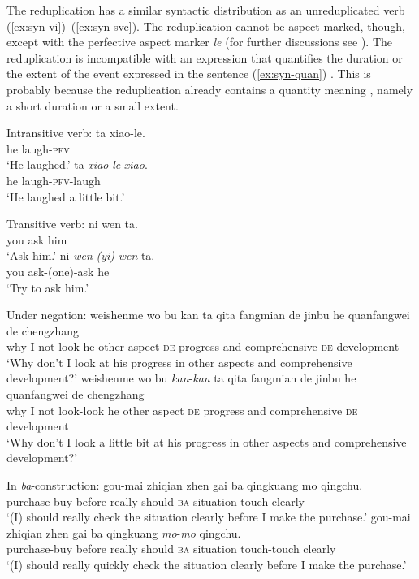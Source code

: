 The reduplication has a similar syntactic distribution as an unreduplicated verb (\ref{ex:syn-vi})--(\ref{ex:syn-svc}). 
The reduplication cannot be aspect marked, though, except with the perfective aspect marker \textit{le} (for further discussions see ). 
The reduplication is incompatible with an expression that quantifies the duration or the extent of the event expressed in the sentence (\ref{ex:syn-quan}) \citetext{ \citealp[83--84]{Li1998}; \citealp[114--115]{Chen2005}}.
This is probably because the reduplication already contains a quantity meaning \citetext{\citealp[84]{Li1998}; \citealp[114--115]{Chen2005}}, namely a short duration or a small extent.

\settowidth{}
\begin{sloppypar}
\ea\label{ex:syn-vi} Intransitive verb:
		\ea \gll ta xiao-le.\\
		he laugh-\textsc{pfv}\\
		\glt `He laughed.'
		\ex \gll ta \textit{xiao}-\textit{le}-\textit{xiao}.\\
		he laugh-\textsc{pfv}-laugh\\
		\glt `He laughed a little bit.'
		\z
        
\ex Transitive verb:
		\ea \gll ni wen ta.\\
		you ask him\\
		\glt `Ask him.'
		\ex \gll ni \textit{wen}-\textit{(yi)}-\textit{wen} ta.\\
		you ask-(one)-ask he\\
		\glt `Try to ask him.'
		\z

\ex Under negation:
		\ea \gll weishenme wo bu kan ta qita fangmian de jinbu he quanfangwei de chengzhang\\
		why I not look he other aspect \textsc{de} progress and comprehensive \textsc{de} development\\
		\glt `Why don't I look at his progress in other aspects and comprehensive development?'
		\ex \gll weishenme wo bu \textit{kan}-\textit{kan} ta qita fangmian de jinbu he quanfangwei de chengzhang\\
		why I not look-look he other aspect \textsc{de} progress and comprehensive \textsc{de} development\\ 
		\glt `Why don't I look a little bit at his progress in other aspects and comprehensive development?'
		\z

\ex In \textit{ba}-construction:
		\ea \gll gou-mai zhiqian zhen gai ba qingkuang mo qingchu.\\
		purchase-buy before really should \textsc{ba} situation touch clearly\\
		\glt `(I) should really check the situation clearly before I make the purchase.'
		\ex \gll gou-mai zhiqian zhen gai ba qingkuang \textit{mo}-\textit{mo} qingchu.\\
		purchase-buy before really should \textsc{ba} situation touch-touch clearly\\ 
		\glt `(I) should really quickly check the situation clearly before I make the purchase.'
		\z


\end{sloppypar}

